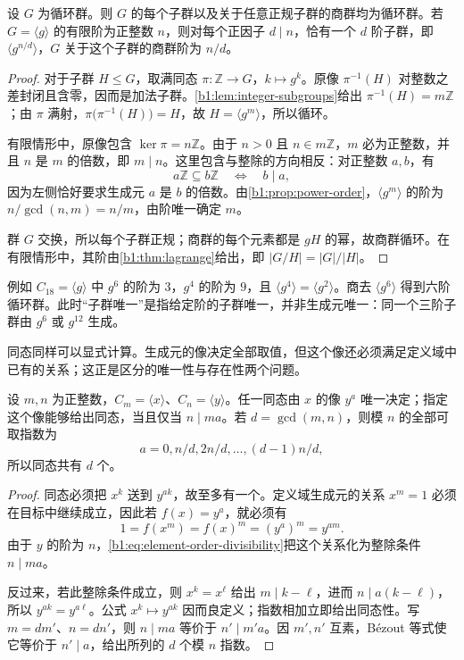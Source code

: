 \begin{theorem}\label{b1:thm:cyclic-subgroups}
	设 \(G\) 为循环群。则 \(G\) 的每个子群以及关于任意正规子群的商群均为循环群。若 \(G=\langle g\rangle\) 的有限阶为正整数 \(n\)，则对每个正因子 \(d\mid n\)，恰有一个 \(d\) 阶子群，即 \(\langle g^{n/d}\rangle\)，\(G\) 关于这个子群的商群阶为 \(n/d\)。
\end{theorem}
\begin{proof}
	对于子群 \(H\leq G\)，取满同态 \(\pi:\mathbb Z\rightarrow G\)，\(k\mapsto g^k\)。原像 \(\pi^{-1}(H)\) 对整数之差封闭且含零，因而是加法子群。\cref{b1:lem:integer-subgroups}给出 \(\pi^{-1}(H)=m\mathbb Z\)；由 \(\pi\) 满射，\(\pi\bigl(\pi^{-1}(H)\bigr)=H\)，故 \(H=\langle g^m\rangle\)，所以循环。

	有限情形中，原像包含 \(\ker\pi=n\mathbb Z\)。由于 \(n>0\) 且 \(n\in m\mathbb Z\)，\(m\) 必为正整数，并且 \(n\) 是 \(m\) 的倍数，即 \(m\mid n\)。这里包含与整除的方向相反：对正整数 \(a,b\)，有
	\[
		a\mathbb Z\subseteq b\mathbb Z\quad\Longleftrightarrow\quad b\mid a,
	\]
	因为左侧恰好要求生成元 \(a\) 是 \(b\) 的倍数。由\cref{b1:prop:power-order}，\(\langle g^m\rangle\) 的阶为 \(n/\gcd(n,m)=n/m\)，由阶唯一确定 \(m\)。

	群 \(G\) 交换，所以每个子群正规；商群的每个元素都是 \(gH\) 的幂，故商群循环。在有限情形中，其阶由\cref{b1:thm:lagrange}给出，即 \(\lvert G/H\rvert=\lvert G\rvert/\lvert H\rvert\)。
\end{proof}

例如 \(C_{18}=\langle g\rangle\) 中 \(g^6\) 的阶为 \(3\)，\(g^4\) 的阶为 \(9\)，且 \(\langle g^4\rangle=\langle g^2\rangle\)。商去 \(\langle g^6\rangle\) 得到六阶循环群。此时“子群唯一”是指给定阶的子群唯一，并非生成元唯一：同一个三阶子群由 \(g^6\) 或 \(g^{12}\) 生成。

\ProseParagraphBreak
同态同样可以显式计算。生成元的像决定全部取值，但这个像还必须满足定义域中已有的关系；这正是区分的唯一性与存在性两个问题。
\begin{proposition}[循环群之间的同态]\label{b1:prop:cyclic-homomorphisms}
	设 \(m,n\) 为正整数，\(C_m=\langle x\rangle\)、\(C_n=\langle y\rangle\)。任一同态由 \(x\) 的像 \(y^a\) 唯一决定；指定这个像能够给出同态，当且仅当 \(n\mid ma\)。若 \(d=\gcd(m,n)\)，则模 \(n\) 的全部可取指数为
	\[
		a=0,n/d,2n/d,\ldots,(d-1)n/d,
	\]
	所以同态共有 \(d\) 个。
\end{proposition}
\begin{proof}
	同态必须把 \(x^k\) 送到 \(y^{ak}\)，故至多有一个。定义域生成元的关系 \(x^m=1\) 必须在目标中继续成立，因此若 \(f(x)=y^a\)，就必须有
	\[
		1=f(x^m)=f(x)^m=(y^a)^m=y^{am}.
	\]
	由于 \(y\) 的阶为 \(n\)，\eqref{b1:eq:element-order-divisibility}把这个关系化为整除条件 \(n\mid ma\)。

	反过来，若此整除条件成立，则 \(x^k=x^\ell\) 给出 \(m\mid k-\ell\)，进而 \(n\mid a(k-\ell)\)，所以 \(y^{ak}=y^{a\ell}\)。公式 \(x^k\mapsto y^{ak}\) 因而良定义；指数相加立即给出同态性。写 \(m=dm'\)、\(n=dn'\)，则 \(n\mid ma\) 等价于 \(n'\mid m'a\)。因 \(m',n'\) 互素，Bézout 等式使它等价于 \(n'\mid a\)，给出所列的 \(d\) 个模 \(n\) 指数。
\end{proof}

